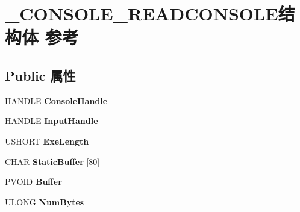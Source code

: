 \hypertarget{struct___c_o_n_s_o_l_e___r_e_a_d_c_o_n_s_o_l_e}{}\section{\+\_\+\+C\+O\+N\+S\+O\+L\+E\+\_\+\+R\+E\+A\+D\+C\+O\+N\+S\+O\+L\+E结构体 参考}
\label{struct___c_o_n_s_o_l_e___r_e_a_d_c_o_n_s_o_l_e}
\subsection*{Public 属性}
\begin{DoxyCompactItemize}
\item 
\mbox{\label{struct___c_o_n_s_o_l_e___r_e_a_d_c_o_n_s_o_l_e_ac6aa4564d341fe520511a0f9bf142389}} 
\hyperlink{interfacevoid}{H\+A\+N\+D\+LE} {\bfseries Console\+Handle}
\item 
\mbox{\label{struct___c_o_n_s_o_l_e___r_e_a_d_c_o_n_s_o_l_e_a0e0a3d33388aa1348a1d3d68844dc1af}} 
\hyperlink{interfacevoid}{H\+A\+N\+D\+LE} {\bfseries Input\+Handle}
\item 
\mbox{\label{struct___c_o_n_s_o_l_e___r_e_a_d_c_o_n_s_o_l_e_a000790bdf834c3ef9aff66bde444e98b}} 
U\+S\+H\+O\+RT {\bfseries Exe\+Length}
\item 
\mbox{\label{struct___c_o_n_s_o_l_e___r_e_a_d_c_o_n_s_o_l_e_aee4181ebf63e68cabe2df88851346105}} 
C\+H\+AR {\bfseries Static\+Buffer} \mbox{[}80\mbox{]}
\item 
\mbox{\label{struct___c_o_n_s_o_l_e___r_e_a_d_c_o_n_s_o_l_e_ad3492962b2bc442788496cc19ac6da11}} 
\hyperlink{interfacevoid}{P\+V\+O\+ID} {\bfseries Buffer}
\item 
\mbox{\label{struct___c_o_n_s_o_l_e___r_e_a_d_c_o_n_s_o_l_e_a260f75265ac57459436c5f081471d03f}} 
U\+L\+O\+NG {\bfseries Num\+Bytes}
\item 
\mbox{\label{struct___c_o_n_s_o_l_e___r_e_a_d_c_o_n_s_o_l_e_ab1fd208e23bfe5d8931e68d278b04f24}} 

\end{DoxyCompactItemize}
